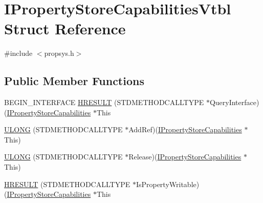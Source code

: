\hypertarget{struct_i_property_store_capabilities_vtbl}{}\section{I\+Property\+Store\+Capabilities\+Vtbl Struct Reference}
\label{struct_i_property_store_capabilities_vtbl}


{\ttfamily \#include $<$propsys.\+h$>$}

\subsection*{Public Member Functions}
\begin{DoxyCompactItemize}
\item 
B\+E\+G\+I\+N\+\_\+\+I\+N\+T\+E\+R\+F\+A\+CE \hyperlink{struct_i_property_store_capabilities_vtbl_aff61b9344f3c975240d55a41822bed9d}{H\+R\+E\+S\+U\+LT} (S\+T\+D\+M\+E\+T\+H\+O\+D\+C\+A\+L\+L\+T\+Y\+PE $\ast$Query\+Interface)(\hyperlink{propsys_8h_ac221aa2d5a03ae9f3e3bbab050a17a71}{I\+Property\+Store\+Capabilities} $\ast$This
\item 
\hyperlink{struct_i_property_store_capabilities_vtbl_af2a7f63407562c5f5799bbf06342f41e}{U\+L\+O\+NG} (S\+T\+D\+M\+E\+T\+H\+O\+D\+C\+A\+L\+L\+T\+Y\+PE $\ast$Add\+Ref)(\hyperlink{propsys_8h_ac221aa2d5a03ae9f3e3bbab050a17a71}{I\+Property\+Store\+Capabilities} $\ast$This)
\item 
\hyperlink{struct_i_property_store_capabilities_vtbl_ac7d647988dd7733686f3df66490a2707}{U\+L\+O\+NG} (S\+T\+D\+M\+E\+T\+H\+O\+D\+C\+A\+L\+L\+T\+Y\+PE $\ast$Release)(\hyperlink{propsys_8h_ac221aa2d5a03ae9f3e3bbab050a17a71}{I\+Property\+Store\+Capabilities} $\ast$This)
\item 
\hyperlink{struct_i_property_store_capabilities_vtbl_a2894f290839a098bf8dbf605193086af}{H\+R\+E\+S\+U\+LT} (S\+T\+D\+M\+E\+T\+H\+O\+D\+C\+A\+L\+L\+T\+Y\+PE $\ast$Is\+Property\+Writable)(\hyperlink{propsys_8h_ac221aa2d5a03ae9f3e3bbab050a17a71}{I\+Property\+Store\+Capabilities} $\ast$This
\end{DoxyCompactItemize}
